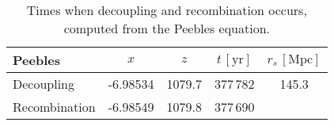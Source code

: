 \begin{table}[h]
\centering
\caption{Times when decoupling and recombination occurs, computed from the Peebles equation.}
\label{tab:M2:results:rec_and_dec_time_table_Peebles}
\begin{tabular}{l|cccc}
\toprule
      Peebles &      $x$ &    $z$ & $t\,\mathrm{[yr]}$ & $r_s \,\mathrm{[Mpc]}$ \\
\midrule
   Decoupling & -6.98534 & 1079.7 &           377\,782 &                  145.3 \\
Recombination & -6.98549 & 1079.8 &           377\,690 &                        \\
\bottomrule
\end{tabular}
\end{table}
